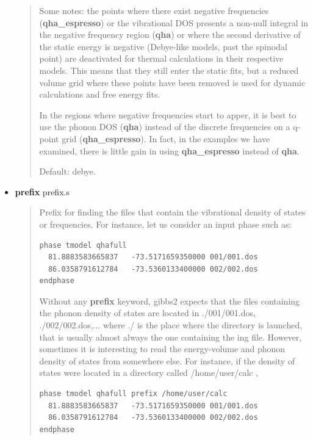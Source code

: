 \documentclass[a4paper]{article}
\begin{document}
\begin{itemize}
\begin{quote}
\begin{itemize}
\begin{description}
\end{description}

\end{itemize}

Some notes: the points where there exist negative
frequencies (\textbf{qha\_espresso}) or the vibrational DOS presents a
non-null integral in the negative frequency region (\textbf{qha}) or
where the second derivative of the static energy is negative
(Debye-like models, past the spinodal point) are deactivated for
thermal calculations in their respective models. This means that
they still enter the static fits, but a reduced volume grid where
these points have been removed is used for dynamic calculations and
free energy fits.

In the regions where negative frequencies start to apper, it is
best to use the phonon DOS (\textbf{qha}) instead of the discrete
frequencies on a q-point grid (\textbf{qha\_espresso}). In fact, in the
examples we have examined, there is little gain in using
\textbf{qha\_espresso} instead of \textbf{qha}.

Default: debye.

\end{quote}

\item \textbf{prefix} prefix.s
%
\begin{quote}

Prefix for finding the files that contain the vibrational density
of states or frequencies. For instance, let us consider an input
phase such as:
%
\gibbslist
\begin{lstlisting}
phase tmodel qhafull
  81.8883583665837   -73.5171659350000 001/001.dos
  86.0358791612784   -73.5360133400000 002/002.dos
endphase
\end{lstlisting}

Without any \textbf{prefix} keyword, gibbs2 expects that the files
containing the phonon density of states are located in
./001/001.dos, ./002/002.dos,... where ./ is the place where the
directory is launched, that is usually almost always the one
containing the ing file. However, sometimes it is interesting to
read the energy-volume and phonon density of states from somewhere
else. For instance, if the density of states were located in a
directory called /home/user/calc ,
%
\gibbslist
\begin{lstlisting}
phase tmodel qhafull prefix /home/user/calc
  81.8883583665837   -73.5171659350000 001/001.dos
  86.0358791612784   -73.5360133400000 002/002.dos
endphase
\end{lstlisting}


\end{quote}
\end{itemize}
\end{document}
